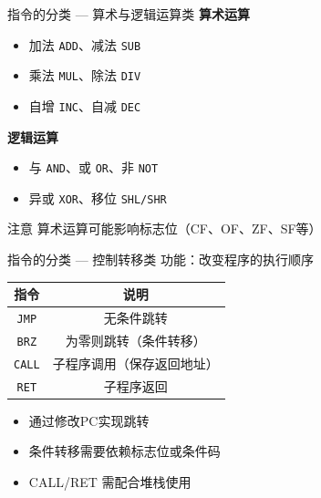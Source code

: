 \documentclass[10pt, aspectratio=169]{beamer}
\begin{document}
\begin{frame}{指令的分类 --- 算术与逻辑运算类}
    \textbf{算术运算}
    \begin{itemize}
        \item 加法 \texttt{ADD}、减法 \texttt{SUB}
        \item 乘法 \texttt{MUL}、除法 \texttt{DIV}
        \item 自增 \texttt{INC}、自减 \texttt{DEC}
    \end{itemize}
    \vspace{0.3em}
    \textbf{逻辑运算}
    \begin{itemize}
        \item 与 \texttt{AND}、或 \texttt{OR}、非 \texttt{NOT}
        \item 异或 \texttt{XOR}、移位 \texttt{SHL/SHR}
    \end{itemize}
    \vspace{0.3em}
    \begin{block}{注意}
        算术运算可能影响标志位（CF、OF、ZF、SF等）
    \end{block}
\end{frame}

\begin{frame}{指令的分类 --- 控制转移类}
    功能：改变程序的执行顺序
    \vspace{0.3em}
    \begin{tabular}{|c|c|}
        \hline
        \textbf{指令} & \textbf{说明} \\
        \hline
        \texttt{JMP}   & 无条件跳转 \\
        \texttt{BRZ}   & 为零则跳转（条件转移） \\
        \texttt{CALL}  & 子程序调用（保存返回地址） \\
        \texttt{RET}   & 子程序返回 \\
        \hline
    \end{tabular}
    \vspace{0.5em}
    \begin{itemize}
        \item 通过修改PC实现跳转
        \item 条件转移需要依赖标志位或条件码
        \item CALL/RET 需配合堆栈使用
    \end{itemize}
\end{frame}
\end{document}
